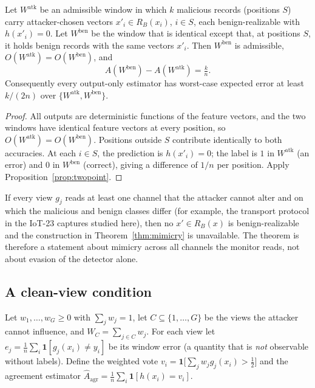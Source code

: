 \begin{theorem}\label{thm:mimicry}
Let $W^{\mathrm{atk}}$ be an admissible window in which $k$ malicious records (positions $S$) carry attacker-chosen vectors $x'_i\in R_B(x_i)$, $i\in S$, each benign-realizable with $h(x'_i)=0$. Let $W^{\mathrm{ben}}$ be the window that is identical except that, at positions $S$, it holds benign records with the same vectors $x'_i$. Then $W^{\mathrm{ben}}$ is admissible, $O(W^{\mathrm{atk}})=O(W^{\mathrm{ben}})$, and
\[
A(W^{\mathrm{ben}})-A(W^{\mathrm{atk}})=\tfrac{k}{n}.
\]
Consequently every output-only estimator has worst-case expected error at least $k/(2n)$ over $\{W^{\mathrm{atk}},W^{\mathrm{ben}}\}$.
\end{theorem}
\begin{proof}
All outputs are deterministic functions of the feature vectors, and the two windows have identical feature vectors at every position, so $O(W^{\mathrm{atk}})=O(W^{\mathrm{ben}})$. Positions outside $S$ contribute identically to both accuracies. At each $i\in S$, the prediction is $h(x'_i)=0$; the label is $1$ in $W^{\mathrm{atk}}$ (an error) and $0$ in $W^{\mathrm{ben}}$ (correct), giving a difference of $1/n$ per position. Apply Proposition~\ref{prop:twopoint}.
\end{proof}

\begin{remark}
If every view $g_j$ reads at least one channel that the attacker cannot alter and on which the malicious and benign classes differ (for example, the transport protocol in the IoT-23 captures studied here), then no $x'\in R_B(x)$ is benign-realizable and the construction in Theorem~\ref{thm:mimicry} is unavailable. The theorem is therefore a statement about mimicry across all channels the monitor reads, not about evasion of the detector alone.
\end{remark}

\subsection{A clean-view condition}
Let $w_1,\dots,w_G\ge0$ with $\sum_j w_j=1$, let $C\subseteq\{1,\dots,G\}$ be the views the attacker cannot influence, and $W_C=\sum_{j\in C}w_j$. For each view let $e_j=\frac1n\sum_i\mathbf 1[g_j(x_i)\neq y_i]$ be its window error (a quantity that is \emph{not} observable without labels). Define the weighted vote
$v_i=\mathbf 1\big[\sum_j w_j g_j(x_i)>\tfrac12\big]$ and the agreement estimator $\hat A_{\mathrm{agr}}=\frac1n\sum_i\mathbf 1[h(x_i)=v_i]$.


